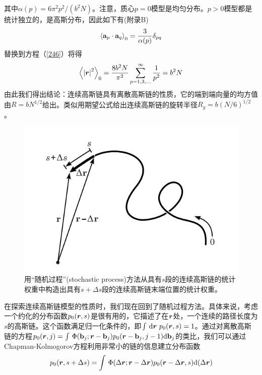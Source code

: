 其中$\alpha (p)=6\pi ^2p^2/(b^2N)$。注意，质心$p=0$模型是均匀分布。$p>0$模型都是统计独立的，是高斯分布，因此如下有(附录B)
\begin{equation}\label{256}
\left \langle \mathbf{a} _p \cdot \mathbf{a} _q \right \rangle _0=\frac{3}{\alpha (p)}\delta _{pq}
\end{equation}
替换到方程（\ref{246}）将得
\begin{equation}\label{257}
\left \langle \left| \bm{r}  \right|^2 \right \rangle _0=\frac{8b^2N}{\pi ^2}\sum_{p=1,3,...}^{\infty}\frac{1}{p^2}=b^2N
\end{equation}
由此我们得出结论：连续高斯链具有离散高斯链的性质，它的端到端向量的均方值由$R=bN^{1/2}$给出。类似用期望公式给出连续高斯链的旋转半径$R_g=b(N/6)^{1/2}$。

\begin{figure}[H]
\centering
\includegraphics[scale=0.7]{./figures/42.png}
\caption{用“随机过程”(stochastic process)方法从具有$s$段的连续高斯链的统计权重中构造出具有$s+\Delta s$段的连续高斯链末端位置的统计权重。} \label{随机过程}
\end{figure}

在探索连续高斯链模型的性质时，我们现在回到了随机过程方法。具体来说，考虑一个约化的分布函数$p_0 (\bm{r} ,s)$是很有用的，它描述了在$\bm{r}$处，一个连续的路径长度为$s$的高斯链。这个函数满足归一化条件的，即$\int \, \mathrm{d} \bm{r} ~p_0(\bm{r} ,s)=1$。通过对离散高斯链的方程$p_0(\bm{r} ,j)=\int \,\Phi(\mathbf{b} _j;\bm{r} -\mathbf{b} _j)p_0(\bm{r} -\mathbf{b} _j,j-1) \mathrm{d} \mathbf{b} _j$的类比，我们可以通过Chapman-Kolmogorov方程利用非常小的链的信息建立分布函数
\begin{equation}\label{258}
p_0(\bm{r} ,s+\Delta s)=\int \,\Phi(\Delta \bm{r} ;\bm{r} -\Delta \bm{r} )p_0(\bm{r} -\Delta \bm{r} ,s) \mathrm{d}(\Delta \bm{r} ) 
\end{equation}


